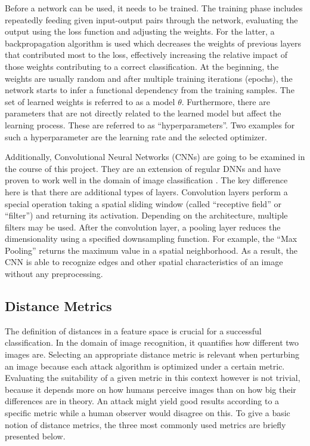 Before a network can be used, it needs to be trained.
The training phase includes repeatedly feeding given input-output pairs through the network, evaluating the output using the loss function and adjusting the weights.
For the latter, a backpropagation algorithm is used which decreases the weights of previous layers that contributed most to the loss, effectively increasing the relative impact of those weights contributing to a correct classification.
At the beginning, the weights are usually random and after multiple training iterations (epochs), the network starts to infer a functional dependency from the training samples.
The set of learned weights is referred to as a model $\theta$.
Furthermore, there are parameters that are not directly related to the learned model but affect the learning process.
These are referred to as \enquote{hyperparameters}.
Two examples for such a hyperparameter are the learning rate and the selected optimizer.

Additionally, Convolutional Neural Networks (CNNs) are going to be examined in the course of this project.
They are an extension of regular DNNs and have proven to work well in the domain of image classification \cite{matsugu2003subject, krizhevsky2012imagenet}.
The key difference here is that there are additional types of layers.
Convolution layers perform a special operation taking a spatial sliding window (called \enquote{receptive field} or \enquote{filter}) and returning its activation.
Depending on the architecture, multiple filters may be used.
After the convolution layer, a pooling layer reduces the dimensionality using a specified downsampling function.
For example, the \enquote{Max Pooling} returns the maximum value in a spatial neighborhood.
As a result, the CNN is able to recognize edges and other spatial characteristics of an image without any preprocessing.

\subsection{Distance Metrics}\label{subsec:metrics}
The definition of distances in a feature space is crucial for a successful classification.
In the domain of image recognition, it quantifies how different two images are.
Selecting an appropriate distance metric is relevant when perturbing an image because each attack algorithm is optimized under a certain metric.
Evaluating the suitability of a given metric in this context however is not trivial, because it depends more on how humans perceive images than on how big their differences are in theory.
An attack might yield good results according to a specific metric while a human observer would disagree on this.
To give a basic notion of distance metrics, the three most commonly used metrics are briefly presented below.

